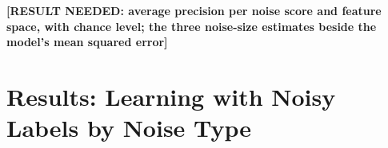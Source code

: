 \textbf{[RESULT NEEDED: average precision per noise score and feature space, with chance level; the three noise-size estimates beside the model's mean squared error]}

\section{Results: Learning with Noisy Labels by Noise Type}


